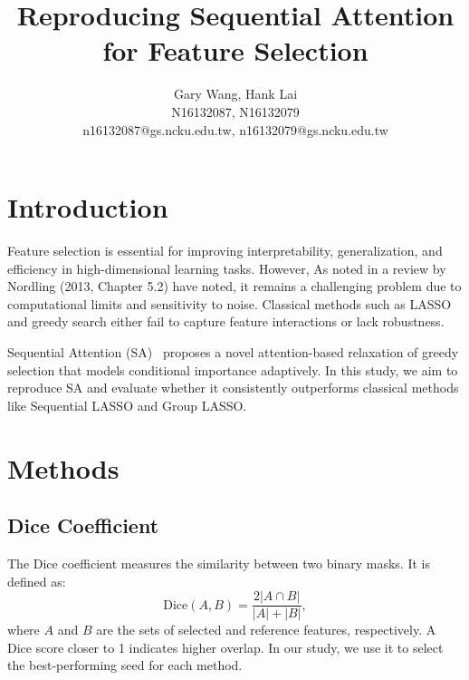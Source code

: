 \documentclass[a4paper,twocolumn]{article} %
\begin{document}

\title{Reproducing Sequential Attention for Feature Selection}
\author{Gary Wang, Hank Lai \\ N16132087, N16132079 \\ n16132087@gs.ncku.edu.tw, n16132079@gs.ncku.edu.tw} 

\maketitle                     %





\section{Introduction}

Feature selection is essential for improving interpretability, generalization, and efficiency in high-dimensional learning tasks.
 However, As noted in a review by Nordling (2013, Chapter 5.2) have noted, it remains a challenging problem due to 
computational limits and sensitivity to noise. Classical methods such as LASSO and greedy search either fail to capture feature interactions or lack robustness.

Sequential Attention (SA)~\cite{yasuda2023} proposes a novel attention-based relaxation of greedy selection that models conditional importance adaptively. 
In this study, we aim to reproduce SA and evaluate whether it consistently outperforms classical methods 
like Sequential LASSO and Group LASSO.


\section{Methods}
\subsection{Dice Coefficient}
The Dice coefficient measures the similarity between two binary masks. It is defined as:
\begin{equation}
    \mathrm{Dice}(A, B) = \frac{2|A \cap B|}{|A| + |B|},
\end{equation}
where $A$ and $B$ are the sets of selected and reference features, respectively. A Dice score closer to 1 indicates higher overlap. In our study, we use it to select the best-performing seed for each method.
\end{document}
